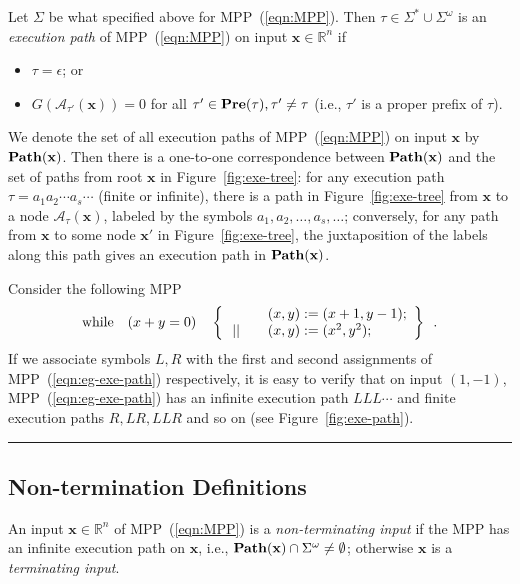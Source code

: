 \documentclass{jssc}
\newcommand{\rulex}{\hfill\rule{1mm}{3mm}}
\newcommand{\while}{{\rm while}}
\newcommand{\A}{\mathcal{A}}
\newcommand{\xx}{\mathbf{x}}
\begin{document}
\begin{definition}\label{dfn:exe-path}
Let $\Sigma$ be what specified above for MPP~(\ref{eqn:MPP}). Then $\tau \in \Sigma^* \cup \Sigma^{\omega}$ is an \emph{execution path} of MPP~(\ref{eqn:MPP}) on input $\xx \in \mathbb{R}^n$ if
\begin{itemize}
\item $\tau=\epsilon$; or
\item $G(\A_{\tau'}(\xx))=0$ for all $\tau' \in {\bf Pre}(\tau), \tau' \neq \tau$ (i.e., $\tau'$ is a proper prefix of $\tau$).
\end{itemize}
\end{definition}

We denote the set of all execution paths of MPP~(\ref{eqn:MPP}) on input $\xx$ by ${\bf Path}(\xx)$. Then there is a one-to-one correspondence between ${\bf Path}(\xx)$ and the set of paths from root $\xx$ in Figure~\ref{fig:exe-tree}: for any execution path $\tau=a_1a_2 \cdots a_s \cdots$ (finite or infinite), there is a path in Figure~\ref{fig:exe-tree} from $\xx$ to a node $\A_{\tau}(\xx)$,  labeled by the symbols $a_1,a_2,\ldots,a_s,\ldots$; conversely, for any path from $\xx$ to some node $\xx'$ in Figure~\ref{fig:exe-tree}, the juxtaposition of the labels along this path gives an execution path in ${\bf Path}(\xx)$.

\begin{example}\label{eg:exe-path}
Consider the following MPP
\begin{equation}\label{eqn:eg-exe-path}
\while \quad (x+y=0) \quad \left\{
\begin{array}{ll}
& \quad (x,y) := (x+1, y-1); \\
\,|| & \quad (x,y) := (x^2, y^2); \\
\end{array}
\right\}
\enspace .
\end{equation}
If we associate symbols $L,R$ with the first and second assignments of MPP~(\ref{eqn:eg-exe-path}) respectively, it is easy to verify that on input $(1,-1)$, MPP~(\ref{eqn:eg-exe-path}) has an infinite execution path $LLL \cdots$ and finite execution paths $R,LR,LLR$ and so on (see Figure~\ref{fig:exe-path}). \rulex
\end{example}

\subsection{Non-termination Definitions}
\begin{definition}\label{def:Termin}
An input $\xx \in \mathbb{R}^n$ of MPP~(\ref{eqn:MPP}) is a {\em non-terminating input} if the MPP has an infinite execution path on $\xx$, i.e., ${\bf Path}(\xx) \cap \Sigma^{\omega} \neq \emptyset$; otherwise $\xx$ is a \emph{terminating input}.
\end{definition}
\end{document}

